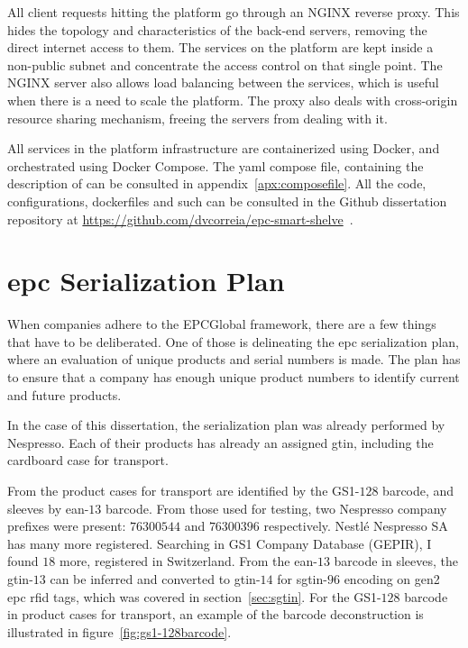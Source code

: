 All client requests hitting the platform go through an NGINX reverse proxy. This hides the topology and characteristics of the back-end servers, removing the direct internet access to them. The services on the platform are kept inside a non-public subnet and concentrate the access control on that single point. The NGINX server also allows load balancing between the services, which is useful when there is a need to scale the platform. The proxy also deals with cross-origin resource sharing mechanism, freeing the servers from dealing with it.

All services in the platform infrastructure are containerized using Docker, and orchestrated using Docker Compose. The yaml compose file, containing the description of  can be consulted in appendix~\ref{apx:composefile}.
All the code, configurations, dockerfiles and such can be consulted in the Github dissertation repository at \url{https://github.com/dvcorreia/epc-smart-shelve}~\cite{DvcorreiaEpcsmartshelve}.

\section{\acs{epc} Serialization Plan}

When companies adhere to the EPCGlobal framework, there are a few things that have to be deliberated.
One of those is delineating the \acs{epc} serialization plan, where an evaluation of unique products and serial numbers is made.
The plan has to ensure that a company has enough unique product numbers to identify current and future products.

In the case of this dissertation, the serialization plan was already performed by Nespresso.
Each of their products has already an assigned \ac{gtin}, including the cardboard case for transport.

From the product cases for transport are identified by the GS1-$128$ barcode, and sleeves by \acs{ean}-$13$ barcode. From those used for testing, two Nespresso company prefixes were present: $76300544$ and $76300396$ respectively. Nestlé Nespresso SA has many more registered. Searching in GS1 Company Database (GEPIR), I found $18$ more, registered in Switzerland.
From the \acs{ean}-$13$ barcode in sleeves, the \acs{gtin}-$13$ can be inferred and converted to \acs{gtin}-$14$ for \ac{sgtin}-$96$ encoding on \ac{gen2} \ac{epc} \acs{rfid} tags, which was covered in section~\ref{sec:sgtin}.
For the GS1-$128$ barcode in product cases for transport, an example of the barcode deconstruction is illustrated in figure~\ref{fig:gs1-128barcode}.

